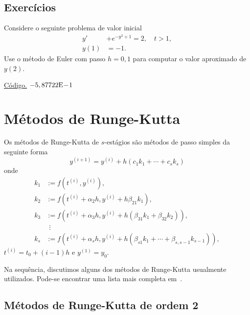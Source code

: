 \subsection*{Exercícios}

\begin{exer}
  Considere o seguinte problema de valor inicial
  \begin{align}
    y' &+ e^{-y^2+1} = 2,\quad t>1,\\
    y(1) &= -1.
  \end{align}
Use o método de Euler com passo $h=0,1$ para computar o valor aproximado de $y(2)$.
\end{exer}
\begin{resp}
  \ifisoctave 
  \href{https://github.com/phkonzen/notas/blob/master/src/MatematicaNumerica/cap_pvi/dados/exer_Euler_pvi1/exer_Euler_pvi1.m}{Código.} 
  \fi
  $-5,87722\mathrm{E}\!-\!1$
\end{resp}


\section{Métodos de Runge-Kutta}\label{cap_pvi_sec_RK}

Os métodos de Runge-Kutta de $s$-estágios são métodos de passo simples da seguinte forma
\begin{equation}
  y^{(i+1)} = y^{(i)} + h(c_1k_1 + \cdots + c_sk_s)
\end{equation}
onde
\begin{align}
  k_1 &:= f(t^{(i)},y^{(i)}),\\
  k_2 &:= f(t^{(i)}+\alpha_2h,y^{(i)}+h\beta_{21}k_1),\\
  k_3 &:= f(t^{(i)}+\alpha_3h,y^{(i)}+h(\beta_{31}k_1+\beta_{32}k_2)),\\
      &~~\vdots\\
  k_s &:= f(t^{(i)}+\alpha_sh,y^{(i)}+h(\beta_{s1}k_1+\cdots+\beta_{s,s-1}k_{s-1})),
\end{align}
$t^{(i)}=t_0+(i-1)h$ e $y^{(1)}=y_0$.

Na sequência, discutimos alguns dos métodos de Runge-Kutta usualmente utilizados. Pode-se encontrar uma lista mais completa em~\cite[Cap. 8, Seç. 3.2]{Isaacson1994a}.

\subsection{Métodos de Runge-Kutta de ordem 2}

